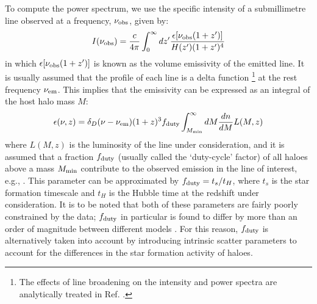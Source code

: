 To compute the power spectrum, we use the specific intensity of a submillimetre line  observed at a frequency, $\nu_{\rm obs}$, given by:
\begin{equation}
 I(\nu_{\rm obs}) = \frac{c}{4 \pi} \int_0^{\infty} dz' \frac{\epsilon[\nu_{\rm obs} (1 + z')]}{H(z') (1 + z')^4}
\end{equation} 
in which $\epsilon[\nu_{\rm obs} (1 + z')]$ is known as the volume emissivity of the emitted line.
It is usually assumed that the profile of each line is a delta function \footnote{The effects of line broadening on the intensity and power spectra are analytically treated in Ref. \cite{chung2021lb}.} at the rest frequency $\nu_{\rm em}$. This implies that the emissivity can be expressed as an integral of the host halo mass $M$:
\begin{equation}
 \epsilon(\nu, z) = \delta_D(\nu - \nu_{\rm em}) (1 + z)^3 f_{\rm duty} \int_{M_{\rm min}}^{\infty} dM \frac{dn}{dM} L(M,z)
 \label{emissivity}
\end{equation} 
where $L (M,z)$ is the luminosity of the line under consideration, and it is assumed that a fraction $f_{\rm duty}$ (usually called the `duty-cycle' factor) of all haloes above a mass $M_{\rm min}$ contribute to the observed emission  in the line of interest, e.g., \cite{lidz2011}. This parameter can be approximated by $f_{\rm duty} = t_s/t_H$, where $t_s$ is the star formation timescale and $t_H$ is the Hubble time at the redshift under consideration. 
It is to be noted that both of these parameters are fairly poorly constrained by the data;  $f_{\rm duty}$ in particular is found to differ by more than an order of magnitude between different models \cite{pullen2013, keating2016}. For this reason, $f_{\rm duty}$ is alternatively taken into account by introducing intrinsic scatter parameters \cite{li2015} to account for the differences in the star formation activity of haloes.

